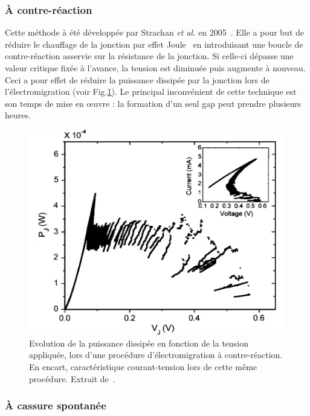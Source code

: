 \subsubsection{À contre-réaction}
Cette méthode à été développée par Strachan \textit{et al.} en 2005~\cite{Strachan2005}. Elle a pour but de réduire le chauffage de la jonction par effet Joule~\cite{Esen2005} en introduisant une boucle de contre-réaction asservie sur la résistance de la jonction. Si celle-ci dépasse une valeur critique fixée à l'avance, la tension est diminuée puis augmente à nouveau. Ceci a pour effet de réduire la puissance dissipée par la jonction lors de l'électromigration (voir Fig.\ref{EseExemp}). Le principal inconvénient de cette technique est son temps de mise en œuvre : la formation d'un seul gap peut prendre plusieurs heures.


\begin{figure}
\parbox{7cm}{
\includegraphics[scale=0.45]{Fabrication/ElecMigExemp/EseFig.pdf} 
}
\parbox{6.5cm}{\caption{Evolution de la puissance dissipée en fonction de la tension appliquée, lors d'une procédure d'électromigration à contre-réaction. En encart, caractéristique courant-tension lors de cette m\^eme procédure. Extrait de~\cite{Esen2005}.}
\label{EseExemp}
}
\end{figure}


\subsubsection{À cassure spontanée}

